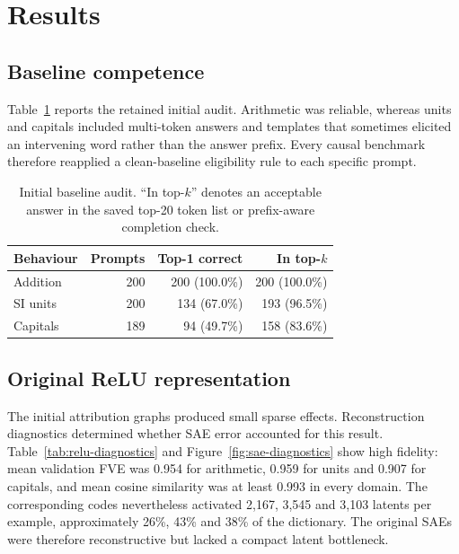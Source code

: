 \documentclass[11pt,a4paper]{article}
\begin{document}
\section{Results}

\subsection{Baseline competence}

    Table~\ref{tab:baseline} reports the retained initial audit. Arithmetic was reliable, whereas units and capitals included multi-token answers and templates that sometimes elicited an intervening word rather than the answer prefix. Every causal benchmark therefore reapplied a clean-baseline eligibility rule to each specific prompt.

    \begin{table}[htbp]
    \centering
    \caption{Initial baseline audit. ``In top-$k$'' denotes an acceptable answer in the saved top-20 token list or prefix-aware completion check.}
    \label{tab:baseline}
    \begin{tabular}{lrrr}
    \toprule Behaviour & Prompts & Top-1 correct & In top-$k$ \\
    \midrule Addition & 200 & 200 (100.0\%) & 200 (100.0\%) \\
    SI units & 200 & 134 (67.0\%) & 193 (96.5\%) \\
    Capitals & 189 & 94 (49.7\%) & 158 (83.6\%) \\
    \bottomrule
    \end{tabular}
    \end{table}

\subsection{Original ReLU representation}

    The initial attribution graphs produced small sparse effects. Reconstruction diagnostics determined whether SAE error accounted for this result. Table~\ref{tab:relu-diagnostics} and Figure~\ref{fig:sae-diagnostics} show high fidelity: mean validation FVE was 0.954 for arithmetic, 0.959 for units and 0.907 for capitals, and mean cosine similarity was at least 0.993 in every domain. The corresponding codes nevertheless activated 2,167, 3,545 and 3,103 latents per example, approximately 26\%, 43\% and 38\% of the dictionary. The original SAEs were therefore reconstructive but lacked a compact latent bottleneck.
\end{document}
